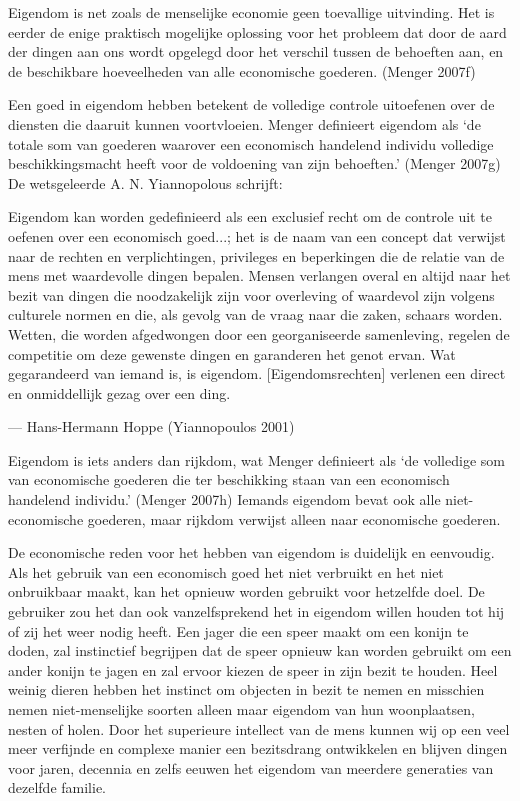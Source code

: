 \documentclass[
  a5paper,
  smalldemyvopaper,11pt,twoside,onecolumn,openright,extrafontsizes,
hidelinks]{memoir}
\begin{document}
Eigendom is net zoals de menselijke economie geen toevallige uitvinding.
Het is eerder de enige praktisch mogelijke oplossing voor het probleem
dat door de aard der dingen aan ons wordt opgelegd door het verschil
tussen de behoeften aan, en de beschikbare hoeveelheden van alle
economische goederen. (Menger 2007f)

Een goed in eigendom hebben betekent de volledige controle uitoefenen
over de diensten die daaruit kunnen voortvloeien. Menger definieert
eigendom als `de totale som van goederen waarover een economisch
handelend individu volledige beschikkingsmacht heeft voor de voldoening
van zijn behoeften.' (Menger 2007g) De wetsgeleerde A. N. Yiannopolous
schrijft:

Eigendom kan worden gedefinieerd als een exclusief recht om de controle
uit te oefenen over een economisch goed...; het is de naam van een
concept dat verwijst naar de rechten en verplichtingen, privileges en
beperkingen die de relatie van de mens met waardevolle dingen bepalen.
Mensen verlangen overal en altijd naar het bezit van dingen die
noodzakelijk zijn voor overleving of waardevol zijn volgens culturele
normen en die, als gevolg van de vraag naar die zaken, schaars worden.
Wetten, die worden afgedwongen door een georganiseerde samenleving,
regelen de competitie om deze gewenste dingen en garanderen het genot
ervan. Wat gegarandeerd van iemand is, is eigendom.
{[}Eigendomsrechten{]} verlenen een direct en onmiddellijk gezag over
een ding.

--- Hans-Hermann Hoppe (Yiannopoulos 2001)

Eigendom is iets anders dan rijkdom, wat Menger definieert als `de
volledige som van economische goederen die ter beschikking staan van een
economisch handelend individu.' (Menger 2007h) Iemands eigendom bevat
ook alle niet-economische goederen, maar rijkdom verwijst alleen naar
economische goederen.

De economische reden voor het hebben van eigendom is duidelijk en
eenvoudig. Als het gebruik van een economisch goed het niet verbruikt en
het niet onbruikbaar maakt, kan het opnieuw worden gebruikt voor
hetzelfde doel. De gebruiker zou het dan ook vanzelfsprekend het in
eigendom willen houden tot hij of zij het weer nodig heeft. Een jager
die een speer maakt om een konijn te doden, zal instinctief begrijpen
dat de speer opnieuw kan worden gebruikt om een ander konijn te jagen en
zal ervoor kiezen de speer in zijn bezit te houden. Heel weinig dieren
hebben het instinct om objecten in bezit te nemen en misschien nemen
niet-menselijke soorten alleen maar eigendom van hun woonplaatsen,
nesten of holen. Door het superieure intellect van de mens kunnen wij op
een veel meer verfijnde en complexe manier een bezitsdrang ontwikkelen
en blijven dingen voor jaren, decennia en zelfs eeuwen het eigendom van
meerdere generaties van dezelfde familie.
\end{document}
